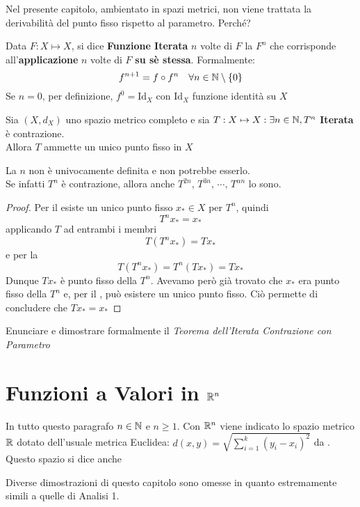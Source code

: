 \begin{exercise}
	Nel presente capitolo, ambientato in spazi metrici, non viene trattata la derivabilità del punto fisso rispetto al parametro. Perché?
\end{exercise}

\begin{definition}
	\label{def:iterata}
	Data $F:X\mapsto X$, si dice \textbf{Funzione Iterata} $n$ volte di $F$ la $F^n$ che corrisponde all'\textbf{applicazione} $n$ volte di $F$ \textbf{su sè stessa}. Formalmente:
	\[f^{n+1} = f \circ f^n \quad \forall n \in \mathbb{N}\setminus\left\{0\right\}\]
	Se $n = 0$, per definizione, $f^0 = \mathrm{Id}_X$ con $\mathrm{Id}_X$ funzione identità su $X$
\end{definition}

\begin{theorem}
	\label{teo:iterata_contraz}
	Sia $(X,d_X)$ uno spazio metrico completo e sia $T:X\mapsto X : \exists n \in \mathbb{N}, T^n$ \textbf{Iterata} è contrazione.\\
	Allora $T$ ammette un unico punto fisso in $X$
	\begin{note}
		La $n$ non è univocamente definita e non potrebbe esserlo.\\
		Se infatti $T^n$ è contrazione, allora anche $T^{2n},\, T^{3n},\, \cdots,\, T^{\alpha n}$ lo sono.
	\end{note}
	\begin{proof}
		Per il  esiste un unico punto fisso $x_* \in X$ per $T^n$, quindi
		\[T^nx_* = x_*\]
		applicando $T$ ad entrambi i membri
		\[T(T^{n}x_*) = Tx_*\]
		e per la 
		\[T(T^{n}x_*) = T^n(Tx_*) = Tx_*\]
		Dunque $Tx_*$ è punto fisso della $T^n$. Avevamo però già trovato che $x_*$ era punto fisso della $T^n$ e, per il , può esistere un unico punto fisso. Ciò permette di concludere che $Tx_* = x_*$
	\end{proof}
\end{theorem}
\begin{exercise}
	Enunciare e dimostrare formalmente il \textit{Teorema dell'Iterata Contrazione con Parametro}
\end{exercise}
\color{black}

\section{Funzioni a Valori in \texorpdfstring{$\protect \mathbb{R}^n$}{Rn}}
In tutto questo paragrafo $n \in \mathbb{N}$ e $n \geq 1$.  Con $\mathbb{R}^n$ viene indicato lo spazio metrico $\mathbb{R}$ dotato dell'usuale metrica Euclidea: $d(x,y) = \sqrt{\sum\limits_{i = 1}^{k} (y_i - x_i)^2}$ da . Questo spazio si dice anche 
\begin{note}
	Diverse dimostrazioni di questo capitolo sono omesse in quanto estremamente simili a quelle di Analisi 1.
\end{note}

